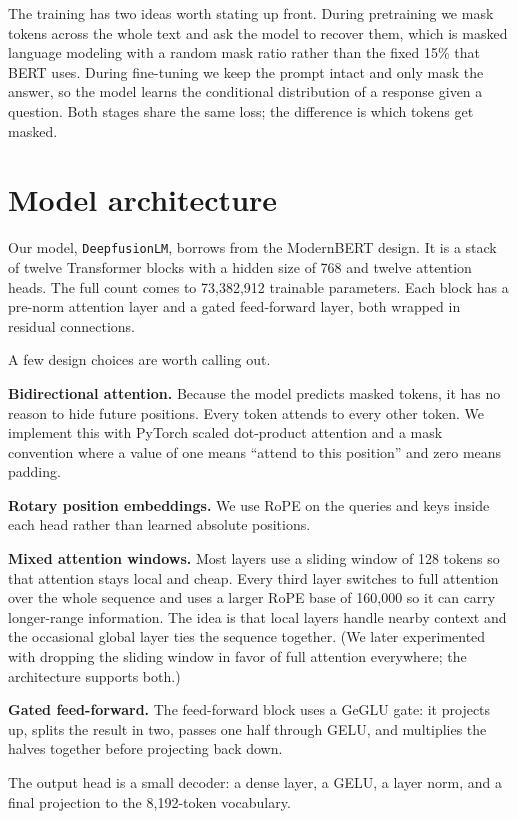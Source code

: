 \documentclass{llncs}
\begin{document}
The training has two ideas worth stating up front. During pretraining we mask tokens across
the whole text and ask the model to recover them, which is masked language modeling with a
random mask ratio rather than the fixed 15\% that BERT uses. During fine-tuning we keep the
prompt intact and only mask the answer, so the model learns the conditional distribution of a
response given a question. Both stages share the same loss; the difference is which tokens get
masked.

\section{Model architecture}

Our model, \texttt{DeepfusionLM}, borrows from the ModernBERT design. It is a stack of twelve
Transformer blocks with a hidden size of 768 and twelve attention heads. The full count comes
to 73{,}382{,}912 trainable parameters. Each block has a pre-norm attention layer and a
gated feed-forward layer, both wrapped in residual connections.

A few design choices are worth calling out.

\textbf{Bidirectional attention.} Because the model predicts masked tokens, it has no reason
to hide future positions. Every token attends to every other token. We implement this with
PyTorch scaled dot-product attention and a mask convention where a value of one means ``attend
to this position'' and zero means padding.

\textbf{Rotary position embeddings.} We use RoPE \cite{rope} on the queries and keys inside
each head rather than learned absolute positions.

\textbf{Mixed attention windows.} Most layers use a sliding window of 128 tokens so that
attention stays local and cheap. Every third layer switches to full attention over the whole
sequence and uses a larger RoPE base of 160{,}000 so it can carry longer-range information.
The idea is that local layers handle nearby context and the occasional global layer ties the
sequence together. (We later experimented with dropping the sliding window in favor of full
attention everywhere; the architecture supports both.)

\textbf{Gated feed-forward.} The feed-forward block uses a GeGLU gate: it projects up, splits
the result in two, passes one half through GELU, and multiplies the halves together before
projecting back down.

The output head is a small decoder: a dense layer, a GELU, a layer norm, and a final
projection to the 8{,}192-token vocabulary.
\end{document}
